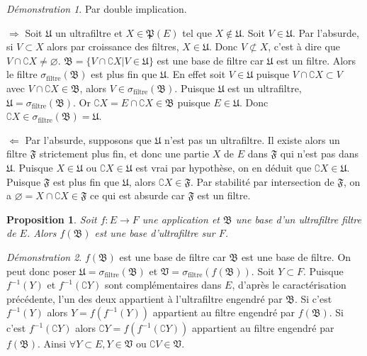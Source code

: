 \documentclass[a4paper, 11pt, french]{book}
\newenvironment{itemise}{\itemize}{\enditemize}
\theoremstyle{plain} %
\newtheorem{proposition}{Proposition}
\theoremstyle{definition} %
\theoremstyle{remark} %
\newtheorem*{demonstration}{Démonstration}
\newcommand{\1}{\mathds{1}}
\newcommand\vide{\varnothing}
\newcommand{\inv}[1]{#1^{-1}}
\newcommand\ou{\text{ ou }}
\begin{document}
\begin{demonstration}
	Par double implication.
	\begin{itemise}
		\item[$\Rightarrow$] Soit $\mathfrak{U}$ un ultrafiltre et $X\in\mathfrak{P}(E)$ tel que $X\notin\mathfrak{U}$.
		Soit $V\in\mathfrak{U}$.
		Par l'absurde, si $V\subset X$ alors par croissance des filtres, $X\in\mathfrak{U}$.
		Donc $V\not\subset X$, c'est à dire que $V\cap\complement X\neq\vide$.
		$\mathfrak{B}=\{V\cap\complement X | V\in\mathfrak{U}\}$ est une base de filtre car $\mathfrak{U}$ est un filtre.
		Alors le filtre $\sigma_\text{filtre}(\mathfrak{B})$ est plus fin que $\mathfrak{U}$.
		En effet soit $V\in\mathfrak{U}$ puisque $V\cap\complement X\subset V$ avec $V\cap\complement X\in\mathfrak{B}$, alors $V\in\sigma_\text{filtre}(\mathfrak{B})$.
		Puisque $\mathfrak{U}$ est un ultrafiltre, $\mathfrak{U}=\sigma_\text{filtre}(\mathfrak{B})$.
		Or $\complement X=E\cap\complement X\in\mathfrak{B}$ puisque $E\in\mathfrak{U}$.
		Donc $\complement X\in\sigma_\text{filtre}(\mathfrak{B})=\mathfrak{U}$.
		\item[$\Leftarrow$] Par l'absurde, supposons que $\mathfrak{U}$ n'est pas un ultrafiltre.
		Il existe alors un filtre $\mathfrak{F}$ strictement plus fin, et donc une partie $X$ de $E$ dans $\mathfrak{F}$ qui n'est pas dans $\mathfrak{U}$.
		Puisque $X\in\mathfrak{U}\ou\complement X\in\mathfrak{U}$ est vrai par hypothèse, on en déduit que $\complement X\in\mathfrak{U}$.
		Puisque $\mathfrak{F}$ est plus fin que $\mathfrak{U}$, alors $\complement X\in\mathfrak{F}$.
		Par stabilité par intersection de $\mathfrak{F}$, on a $\vide=X\cap\complement X\in\mathfrak{F}$ ce qui est absurde car $\mathfrak{F}$ est un filtre.
	\end{itemise}
\end{demonstration}

\begin{proposition}
	Soit $f:E\rightarrow F$ une application et $\mathfrak{B}$ une base d'un ultrafiltre filtre de $E$.
	Alors $f(\mathfrak{B})$ est une base d'ultrafiltre sur $F$.
\end{proposition}

\begin{demonstration}
	$f(\mathfrak{B})$ est une base de filtre car $\mathfrak{B}$ est une base de filtre.
	On peut donc poser $\mathfrak{U}=\sigma_\text{filtre}(\mathfrak{B})$ et $\mathfrak{V}=\sigma_\text{filtre}(f(\mathfrak{B}))$.
	Soit $Y\subset F$.
	Puisque $\inv{f}(Y)$ et $\inv{f}(\complement Y)$ sont complémentaires dans $E$, d'après le caractérisation précédente, l'un des deux appartient à l'ultrafiltre engendré par $\mathfrak{B}$.
	Si c'est $\inv{f}(Y)$ alors $Y=f(\inv{f}(Y))$ appartient au filtre engendré par $f(\mathfrak{B})$.
	Si c'est $\inv{f}(\complement Y)$ alors $\complement Y=f(\inv{f}(\complement Y))$ appartient au filtre engendré par $f(\mathfrak{B})$.
	Ainsi $\forall Y\subset E, Y\in\mathfrak{V}\ou\complement V\in\mathfrak{V}$.
\end{demonstration}
\end{document}
